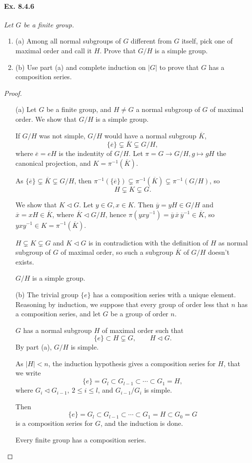 \documentclass[11pt,a4paper]{article}
\newcommand{\be} {\begin{enumerate}}
\newcommand{\ee} {\end{enumerate}}
\begin{document}
\paragraph{Ex. 8.4.6}

{\it Let $G$ be a finite group.
\be
\item[(a)] Among all normal subgroups of $G$ different from $G$ itself, pick one of maximal order and call it $H$. Prove that $G/H$ is a simple group.
\item[(b)] Use part (a) and complete induction on $|G|$ to prove that $G$ has a composition series.
\ee
}

\begin{proof}
\begin{enumerate}
\item[(a)]
Let $G$ be a finite group, and $H\neq G$ a normal subgroup of $G$ of maximal order. We show that $G/H$ is a simple group.

 If $G/H$ was not simple, $G/H$ would have a normal  subgroup  $\overline{K}$,
 $$  \{\overline{e}\}  \subsetneq \overline{K} \subsetneq G/H ,$$
 where $\overline{e} = eH$ is the indentity of $G/H$.
 Let $\pi = G \to G/H, g \mapsto gH$ the canonical projection, and $K =\pi^{-1}(\overline{K})$.

As $\{\overline{e} \} \subsetneq \overline{K} \subsetneq G/H$, 
then $\pi^{-1}(\{\overline{e}\}) \subsetneq \pi^{-1}(\overline{K}) \subsetneq  \pi^{-1}(G/H)$, so
$$H \subsetneq K \subsetneq G.$$

We show that $K \lhd G$. Let  $y \in G, x \in K$. Then $\overline{y} = yH \in G/H$ and $\overline{x} = xH \in \overline{K}$, where $\overline{K}\lhd G/H$, hence $\pi(yxy^{-1}) = \overline{y}\,\overline{x}\,\overline{y}^{-1} \in \overline{K}$, so $yxy^{-1} \in K = \pi^{-1}(\overline{K})$.

$H \subsetneq K \subsetneq G$ and $K \lhd G$ is in contradiction with the definition of  $H$ as normal subgroup of $G$ of maximal order, so such a subgroup $\overline{K}$ of $G/H$ doesn't exists.
\begin{center}
$G/H$ is a simple group.
\end{center}

\item[(b)]
The trivial group $\{e\}$ has a composition series with a unique element.
Reasoning by induction, we suppose that every group of order less that $n$ has a composition series, and let $G$ be a group of order $n$.

$G$ has a normal subgroup $H$ of maximal order such that 
$$\{e\} \subset  H  \subsetneq G, \qquad H \lhd G.$$
By part (a), $G/H$ is simple.

As $|H|<n$, the induction hypothesis gives a composition series for $H$, that we write
$$\{e\} = G_l \subset G_{l-1} \subset \cdots \subset G_1=H,$$
where $G_i \lhd G_{i-1}, \ 2 \leq i \leq l$, and $G_{i-1}/G_i$ is simple.

Then 
$$\{e\} = G_l \subset G_{l-1} \subset \cdots \subset G_1=H  \subset  G_0 = G$$
is a composition series for $G$, and the induction is done.

Every finite group has a composition series.
\end{enumerate}
\end{proof}
\end{document}
